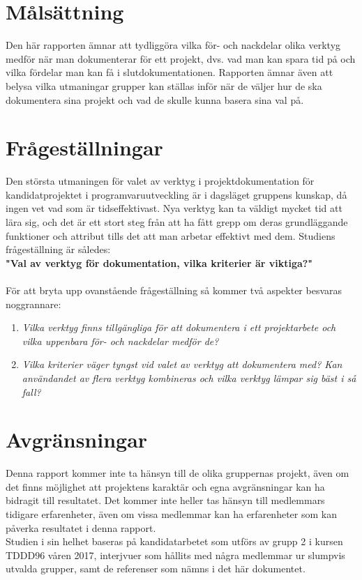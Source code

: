 \section{Målsättning}
\label{sec:wassing-aim}
Den här rapporten ämnar att tydliggöra vilka för- och nackdelar olika verktyg medför när man dokumenterar för ett projekt, dvs. vad man kan spara tid på och vilka fördelar man kan få i slutdokumentationen. Rapporten ämnar även att belysa vilka utmaningar grupper kan ställas inför när de väljer hur de ska dokumentera sina projekt och vad de skulle kunna basera sina val på.

\section{Frågeställningar}
\label{sec:wassing-research-questions}
Den största utmaningen för valet av verktyg i projektdokumentation för kandidatprojektet i programvaruutveckling är i dagsläget gruppens kunskap, då ingen vet vad som är tidseffektivast. Nya verktyg kan ta väldigt mycket tid att lära sig, och det är ett stort steg från att ha fått grepp om deras grundläggande funktioner och attribut tills det att man arbetar effektivt med dem. Studiens frågeställning är således: \\

\textbf{"Val av verktyg för dokumentation, vilka kriterier är viktiga?"} \\ \\
För att bryta upp ovanstående frågeställning så kommer två aspekter besvaras noggrannare:
\begin{enumerate}
\item \textit{Vilka verktyg finns tillgängliga för att dokumentera i ett projektarbete och vilka uppenbara för- och nackdelar medför de?}
\item \textit{Vilka kriterier väger tyngst vid valet av verktyg att dokumentera med? Kan användandet av flera verktyg kombineras och vilka verktyg lämpar sig bäst i så fall?}
\end{enumerate}

\section{Avgränsningar}
\label{sec:wassing-delimitations}
Denna rapport kommer inte ta hänsyn till de olika gruppernas projekt, även om det finns möjlighet att projektens karaktär och egna avgränsningar kan ha bidragit till resultatet. Det kommer inte heller tas hänsyn till medlemmars tidigare erfarenheter, även om vissa medlemmar kan ha erfarenheter som kan påverka resultatet i denna rapport. \\
Studien i sin helhet baseras på kandidatarbetet som utförs av grupp 2 i kursen TDDD96 våren 2017, interjvuer som hållits med några medlemmar ur slumpvis utvalda grupper, samt de referenser som nämns i det här dokumentet.




